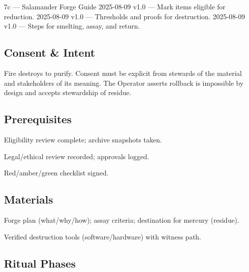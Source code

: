 \label{sec:cast7c-salamander}

\begin{SectionHeaderLedger}{7c — Salamander Forge Guide}
   2025-08-09 v1.0 — Mark items eligible for reduction.
    2025-08-09 v1.0 — Thresholds and proofs for destruction.
     2025-08-09 v1.0 — Steps for smelting, assay, and return.
\end{SectionHeaderLedger}

\subsection*{Consent \& Intent}
Fire destroys to purify. Consent must be explicit from stewards of the material and stakeholders of its meaning. The Operator asserts rollback is impossible by design and accepts stewardship of residue.

\subsection*{Prerequisites}
\begin{tightitemize}
  \item Eligibility review complete; archive snapshots taken.
  \item Legal/ethical review recorded; approvals logged.
  \item Red/amber/green checklist signed.
\end{tightitemize}

\subsection*{Materials}
\begin{tightitemize}
  \item Forge plan (what/why/how); assay criteria; destination for mercury (residue).
  \item Verified destruction tools (software/hardware) with witness path.
\end{tightitemize}

\subsection*{Ritual Phases}
